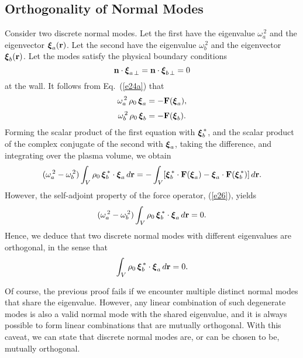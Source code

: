 \documentclass[12pt,prb,aps,notitlepage]{revtex4-1}
\newcommand{\bxi}{\mbox{\boldmath$\xi$}}
\begin{document}
\subsection{Orthogonality of Normal Modes}\label{orth}
Consider two discrete normal modes. Let the first have the eigenvalue $\omega_a^{\,2}$ and the eigenvector $\bxi_a({\bf r})$. Let the
second have the eigenvalue $\omega_b^{\,2}$ and the eigenvector $\bxi_b({\bf r})$. Let the modes satisfy the
physical boundary conditions 
\begin{equation}\label{e91}
{\bf n}\cdot\bxi_{a\,\perp}={\bf n}\cdot\bxi_{b\,\perp} = 0
\end{equation}
at the wall. It follows from Eq.~(\ref{e24a}) that
\begin{align}
\omega_a^{\,2}\,\rho_0\,\bxi_a &= -{\bf F}(\bxi_a),\\[0.5ex]
\omega_b^{\,2}\,\rho_0\,\bxi_b &=- {\bf F}(\bxi_b).
\end{align}
Forming the scalar product of the first equation with $\bxi_b^{\,\ast}$, and the scalar product of the complex conjugate of the second with $\bxi_a$, taking the difference, and integrating over the
plasma volume, we obtain
\begin{equation}
(\omega_a^{\,2}-\omega_b^{\,2})\int_V \rho_0\,\bxi_b^{\,\ast}\cdot\bxi_a\,d{\bf r} = - \int_V [\bxi_b^{\,\ast}\cdot {\bf F}(\bxi_a)-\bxi_a\cdot {\bf F}(\bxi_b^{\,\ast})]\,d{\bf r}.
\end{equation}
However, the self-adjoint property of the force operator, (\ref{e26}), yields
\begin{equation}
(\omega_a^{\,2}-\omega_b^{\,2})\int_V \rho_0\,\bxi_b^{\,\ast}\cdot\bxi_a\,d{\bf r}=0.
\end{equation}
Hence, we deduce that two discrete normal modes with different eigenvalues are {\rm orthogonal}, in the sense that 
\begin{equation}
\int_V \rho_0\,\bxi_b^{\,\ast}\cdot\bxi_a\,d{\bf r}=0.
\end{equation}

Of course, the previous proof fails if we encounter multiple  distinct normal modes that share the eigenvalue. However, any
linear combination of such degenerate modes is also a valid normal mode with the shared eigenvalue, and it is always possible to form linear
combinations that are mutually orthogonal. With this caveat, we can state that discrete normal modes are, or can be chosen to be,  mutually orthogonal. 
\end{document}
